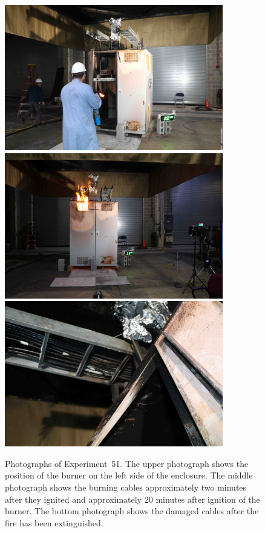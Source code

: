 \begin{figure}[p]
\centering
\includegraphics[height=2.50in]{../FIGURES/Test_51_setup} \\ \vspace{0.1in}
\includegraphics[height=2.50in]{../FIGURES/Test_51_ignition} \\ \vspace{0.1in}
\includegraphics[height=2.50in]{../FIGURES/Test_51_scar}
\caption[Photographs of Experiment~51]{Photographs of Experiment~51. The upper photograph shows the position of the burner on the left side of the enclosure. The middle photograph shows the burning cables approximately two minutes after they ignited and approximately 20 minutes after ignition of the burner. The bottom photograph shows the damaged cables after the fire has been extinguished.}
\label{fig:Test_51_photos}
\end{figure}


